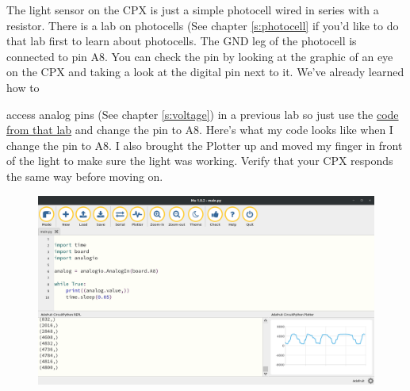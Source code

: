 The light sensor on the CPX is just a simple photocell wired in series with a resistor. There is a lab on photocells (See chapter \ref{s:photocell} if you'd like to do that lab first to learn about photocells. The GND leg of the photocell is connected to pin A8. You can check the pin by looking at the graphic of an eye on the CPX and taking a look at the digital pin next to it. We’ve already learned how to {access analog pins (See chapter \ref{s:voltage}) in a previous lab so just use the \href{https://github.com/cmontalvo251/Microcontrollers/blob/master/Circuit_Playground/CircuitPython/Analog/analog_simple.py}{code from that lab} and change the pin to A8. Here’s what my code looks like when I change the pin to A8. I also brought the Plotter up and moved my finger in front of the light to make sure the light was working. Verify that your CPX responds the same way before moving on.
\begin{figure}[H]
  \begin{center}
    \includegraphics[width=\textwidth]{Figures/modules_light_mu.png}
  \end{center}
\end{figure}
}
